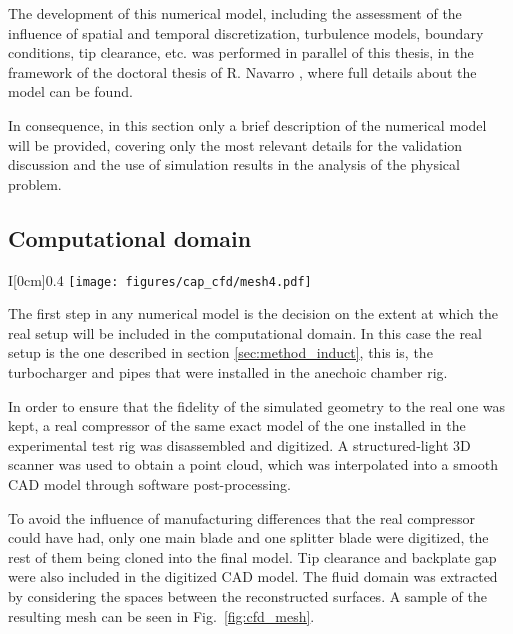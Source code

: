The development of this numerical model, including the assessment of the influence of spatial and temporal discretization, turbulence models, boundary conditions, tip clearance, etc. was performed in parallel of this thesis, in the framework of the doctoral thesis of R. Navarro \cite{navarro2014numerical}, where full details about the model can be found.

In consequence, in this section only a brief description of the numerical model will be provided, covering only the most relevant details for the validation discussion and the use of simulation results in the analysis of the physical problem.

\subsection{Computational domain}

\begin{wrapfigure}[16]{I}[0cm]{0.4\textwidth}
\raggedleft
\vspace{-4mm}
\texttt{[image: figures/cap\_cfd/mesh4.pdf]}
\caption[Sample of the mesh in the CFD model]{Polyhedral mesh of the rotor walls (grey) and the surrounding fluid (blue) used in the CFD model.}
\label{fig:cfd_mesh}
\end{wrapfigure}

The first step in any numerical model is the decision on the extent at which the real setup will be included in the computational domain. In this case the real setup is the one described in section \ref{sec:method_induct}, this is, the turbocharger and pipes that were installed in the anechoic chamber rig. 

In order to ensure that the fidelity of the simulated geometry to the real one was kept, a real compressor of the same exact model of the one installed in the experimental test rig was disassembled and digitized. A structured-light 3D scanner was used to obtain a point cloud, which was interpolated into a smooth CAD model through software post-processing.

To avoid the influence of manufacturing differences that the real compressor could have had, only one main blade and one splitter blade were digitized, the rest of them being cloned into the final model. Tip clearance and backplate gap were also included in the digitized CAD model. The fluid domain was extracted by considering the spaces between the reconstructed surfaces. A sample of the resulting mesh can be seen in Fig.~\ref{fig:cfd_mesh}.

